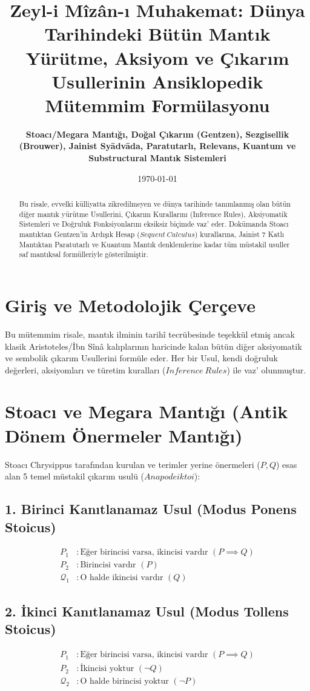 \documentclass[11pt, a4paper]{article}
\title{\textbf{Zeyl-i Mîzân-ı Muhakemat: Dünya Tarihindeki Bütün Mantık Yürütme, Aksiyom ve Çıkarım Usullerinin Ansiklopedik Mütemmim Formülasyonu}}
\author{\textbf{Stoacı/Megara Mantığı, Doğal Çıkarım (Gentzen), Sezgisellik (Brouwer), Jainist Syādvāda, Paratutarlı, Relevans, Kuantum ve Substructural Mantık Sistemleri}}
\date{\today}
\begin{document}
\maketitle

\begin{abstract}
Bu risale, evvelki külliyatta zikredilmeyen ve dünya tarihinde tanımlanmış olan bütün diğer mantık yürütme Usullerini, Çıkarım Kurallarını (Inference Rules), Aksiyomatik Sistemleri ve Doğruluk Fonksiyonlarını eksiksiz biçimde vaz' eder. Dokümanda Stoacı mantıktan Gentzen'in Ardışık Hesap ($Sequent\ Calculus$) kurallarına, Jainist 7 Katlı Mantıktan Paratutarlı ve Kuantum Mantık denklemlerine kadar tüm müstakil usuller saf mantıksal formülleriyle gösterilmiştir.
\end{abstract}

\tableofcontents
\newpage

\section{Giriş ve Metodolojik Çerçeve}

Bu mütemmim risale, mantık ilminin tarihî tecrübesinde teşekkül etmiş ancak klasik Aristoteles/İbn Sînâ kalıplarının haricinde kalan bütün diğer aksiyomatik ve sembolik çıkarım Usullerini formüle eder. Her bir Usul, kendi doğruluk değerleri, aksiyomları ve türetim kuralları ($Inference\ Rules$) ile vaz' olunmuştur.

\section{Stoacı ve Megara Mantığı (Antik Dönem Önermeler Mantığı)}

Stoacı Chrysippus tarafından kurulan ve terimler yerine önermeleri ($P, Q$) esas alan 5 temel müstakil çıkarım usulü ($Anapodeiktoi$):

\subsection{1. Birinci Kanıtlanamaz Usul (Modus Ponens Stoicus)}
\begin{align}
P_1 &: \text{Eğer birincisi varsa, ikincisi vardır } (P \implies Q) \\
P_2 &: \text{Birincisi vardır } (P) \\
\mathcal{Q}_{1} &: \text{O halde ikincisi vardır } (Q)
\end{align}

\subsection{2. İkinci Kanıtlanamaz Usul (Modus Tollens Stoicus)}
\begin{align}
P_1 &: \text{Eğer birincisi varsa, ikincisi vardır } (P \implies Q) \\
P_2 &: \text{İkincisi yoktur } (\neg Q) \\
\mathcal{Q}_{2} &: \text{O halde birincisi yoktur } (\neg P)
\end{align}
\end{document}
